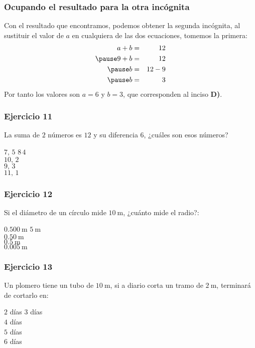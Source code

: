 \begin{frame}
\frametitle{Ocupando el resultado para la otra incógnita}
Con el resultado que encontramos, podemos obtener la segunda incógnita, al sustituir el valor de $a$ en cualquiera de las dos ecuaciones, tomemos la primera:
\pause
\begin{eqnarray*}
a + b &=& 12 \\ \pause
9 + b &=& 12 \\ \pause
b &=& 12 - 9 \\ \pause
b &=& 3
\end{eqnarray*}
\pause
Por tanto los valores son $a = 6$ y $b = 3$, que corresponden al inciso \textbf{D)}.
\end{frame}
\begin{frame}
\frametitle{Ejercicio 11}
La suma de $2$ números es $12$ y su diferencia $6$, ¿cuáles son esos números?
\begin{choices}
\choice $7,\, 5$
\choice $8 \, 4$ \\
\choice $10, \, 2$ \\
\choice $9, \, 3$ \\
\choice $11, \, 1$ \\
\end{choices}
\end{frame}
\begin{frame}
\frametitle{Ejercicio 12}
Si el diámetro de un círculo mide $\SI{10}{\meter}$, ¿cuánto mide el radio?:
\begin{choices}
\choice $\SI{0.500}{\meter}$
\choice $\SI{5}{\meter}$ \\
\choice $\SI{0.50}{\meter}$ \\
\choice $\SI{0.5}{\meter}$ \\
\choice $\SI{0.005}{\meter}$ \\
\end{choices}
\pause
{}
\end{frame}
\begin{frame}
\frametitle{Ejercicio 13}
Un plomero tiene un tubo de $\SI{10}{\meter}$, si a diario corta un tramo de $\SI{2}{\meter}$, terminará de cortarlo en:
\medskip
\begin{choices}
\choice $2$ días
\choice $3$ días \\
\choice $4$ días \\
\choice $5$ días \\
\choice $6$ días \\
\end{choices}
\pause
{}
\end{frame}
